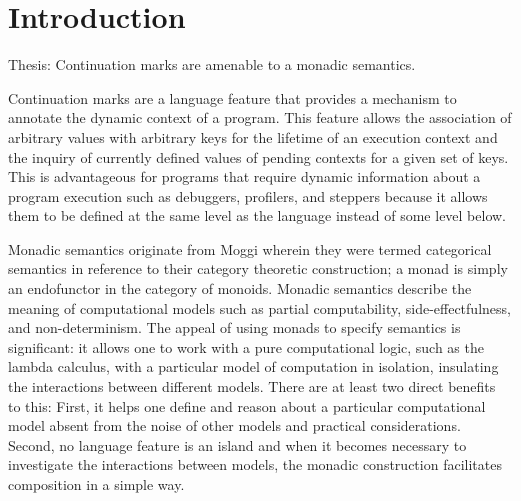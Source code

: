 \documentclass[ms]{byuprop}
\title{\Title}
\author{\Author}
\newcounter{example}
\begin{document}
\maketitle



\section{Introduction}


Thesis: Continuation marks are amenable to a monadic semantics.


Continuation marks \cite{clements2006portable} are a language feature that provides a
mechanism to annotate the dynamic context of a program. This feature allows the
association of arbitrary values with arbitrary keys for the lifetime of an execution
context and the inquiry of currently defined values of pending contexts for a given set of
keys. This is advantageous for programs that require dynamic information about a program
execution such as debuggers, profilers, and steppers because it allows them to be defined
at the same level as the language instead of some level below.



Monadic semantics originate from Moggi \cite{moggi1989computational} wherein they were
termed categorical semantics in reference to their category theoretic construction; a
monad is simply an endofunctor in the category of monoids. Monadic semantics describe the
meaning of computational models such as partial computability, side-effectfulness, and
non-determinism. The appeal of using monads to specify semantics is significant: it allows
one to work with a pure computational logic, such as the lambda calculus, with a
particular model of computation in isolation, insulating the interactions between
different models. There are at least two direct benefits to this: First, it helps one
define and reason about a particular computational model absent from the noise of other
models and practical considerations. Second, no language feature is an island and when it
becomes necessary to investigate the interactions between models, the monadic construction
facilitates composition in a simple way.
\end{document}
